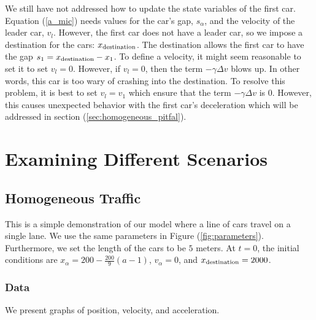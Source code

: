 \documentclass[12pt]{article}
\begin{document}
    We still have not addressed how to update the state variables of the first car. 
    Equation (\ref{a_mic}) needs values for the car's gap, $s_\alpha$, and the velocity of the leader car, $v_l$. 
    However, the first car does not have a leader car, so we impose a destination for the cars: $x_{\rm destination}$. 
    The destination allows the first car to have the gap $s_{1} = x_{\rm destination} - x_{1} $. 
    To define a velocity, it might seem reasonable to set it to set $v_l = 0$. 
    However, if $v_l=0$, then the term $-\gamma \Delta v$ blows up. 
    In other words, this car is too wary of crashing into the destination. 
    To resolve this problem, it is best to set $v_l = v_{1}$ which ensure that the term $-\gamma \Delta v$ is $0$. 
    However, this causes unexpected behavior with the first car's deceleration which will be addressed in section (\ref{sec:homogeneous_pitfal}). 
    
    
    \section{Examining Different Scenarios}
    \subsection{Homogeneous Traffic}\label{sec:homogeneous}

    This is a simple demonstration of our model where a line of cars travel on a single lane. We use the same parameters in Figure (\ref{fig:parameters}). Furthermore, we set the length of the cars to be $5$ meters. At $t=0$, the initial conditions are $x_\alpha = 
    200-\frac{200}{9}\left(a-1\right)$, $v_\alpha = 0$, and $x_{\rm destination} = 2000$.

    \subsubsection{Data}
    We present graphs of position, velocity, and acceleration.
    
\end{document}
